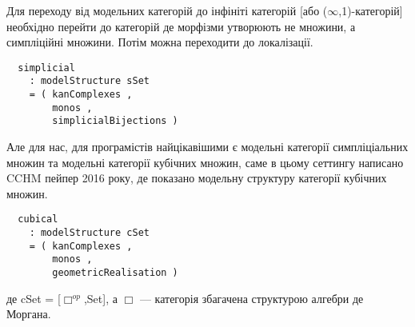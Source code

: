 Для переходу від модельних категорій до інфініті категорій [або ($\infty$,1)-категорій]
необхідно перейти до категорій де морфізми утворюють не множини,
а симпліційні множини. Потім можна переходити до локалізації.

\begin{lstlisting}
  simplicial
    : modelStructure sSet
    = ( kanComplexes ,
        monos ,
        simplicialBijections )
\end{lstlisting}
    
Але для нас, для програмістів найцікавішими є модельні категорії
симпліціальних множин та модельні категорії кубічних множин, саме
в цьому сеттингу написано CCHM пейпер 2016 року, де показано модельну
структуру категорії кубічних множин.

\newpage
\begin{lstlisting}
  cubical
    : modelStructure cSet
    = ( kanComplexes ,
        monos ,
        geometricRealisation )
\end{lstlisting}

де cSet = [$\Box^{op}$,Set], а $\Box$ --- категорія
збагачена структурою алгебри де Моргана.


